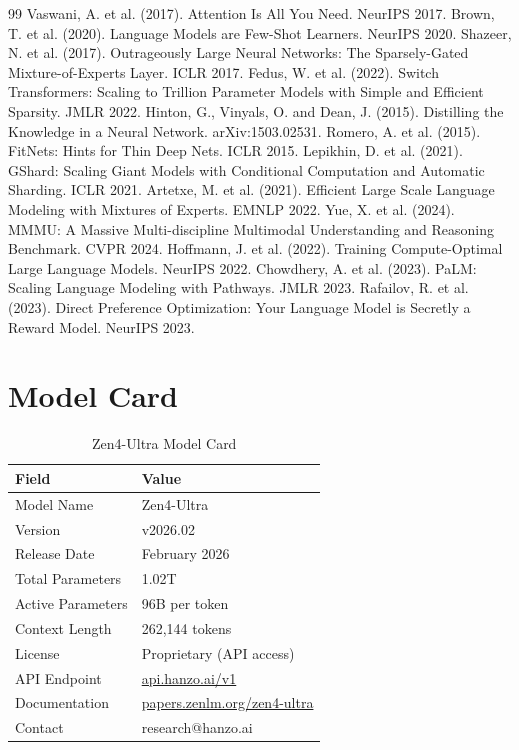 \documentclass[11pt,a4paper]{article}
\begin{document}
\begin{thebibliography}{99}
 Vaswani, A. et al. (2017). Attention Is All You Need. NeurIPS 2017.
 Brown, T. et al. (2020). Language Models are Few-Shot Learners. NeurIPS 2020.
 Shazeer, N. et al. (2017). Outrageously Large Neural Networks: The Sparsely-Gated Mixture-of-Experts Layer. ICLR 2017.
 Fedus, W. et al. (2022). Switch Transformers: Scaling to Trillion Parameter Models with Simple and Efficient Sparsity. JMLR 2022.
 Hinton, G., Vinyals, O. and Dean, J. (2015). Distilling the Knowledge in a Neural Network. arXiv:1503.02531.
 Romero, A. et al. (2015). FitNets: Hints for Thin Deep Nets. ICLR 2015.
 Lepikhin, D. et al. (2021). GShard: Scaling Giant Models with Conditional Computation and Automatic Sharding. ICLR 2021.
 Artetxe, M. et al. (2021). Efficient Large Scale Language Modeling with Mixtures of Experts. EMNLP 2022.
 Yue, X. et al. (2024). MMMU: A Massive Multi-discipline Multimodal Understanding and Reasoning Benchmark. CVPR 2024.
 Hoffmann, J. et al. (2022). Training Compute-Optimal Large Language Models. NeurIPS 2022.
 Chowdhery, A. et al. (2023). PaLM: Scaling Language Modeling with Pathways. JMLR 2023.
 Rafailov, R. et al. (2023). Direct Preference Optimization: Your Language Model is Secretly a Reward Model. NeurIPS 2023.
\end{thebibliography}

\appendix

\section{Model Card}

\begin{table}[H]
\centering
\begin{tabular}{ll}
\toprule
\textbf{Field} & \textbf{Value} \\
\midrule
Model Name       & Zen4-Ultra \\
Version          & v2026.02 \\
Release Date     & February 2026 \\
Total Parameters & 1.02T \\
Active Parameters& 96B per token \\
Context Length   & 262,144 tokens \\
License          & Proprietary (API access) \\
API Endpoint     & \href{https://api.hanzo.ai/v1}{api.hanzo.ai/v1} \\
Documentation    & \href{https://papers.zenlm.org/zen4-ultra}{papers.zenlm.org/zen4-ultra} \\
Contact          & research@hanzo.ai \\
\bottomrule
\end{tabular}
\caption{Zen4-Ultra Model Card}
\end{table}
\end{document}
